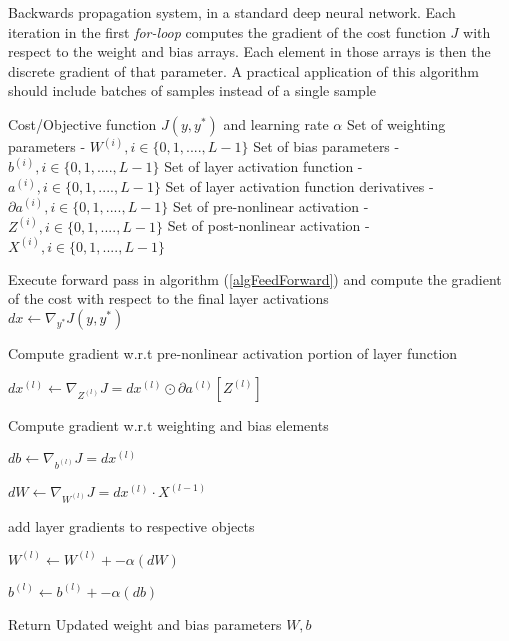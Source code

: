 \documentclass[12pt,letterpaper]{article}
\begin{document}
\begin{algorithm}[H]
\caption{Backwards propagation system, in a standard deep neural network. Each iteration in the first \textit{for-loop} computes the gradient of the cost function $J$ with respect to the weight and bias arrays. Each element in those arrays is then the discrete gradient of that parameter. A practical application of this algorithm should include batches of samples instead of a single sample}
\label{algBackProp}

\begin{algorithmic}
\REQUIRE Cost/Objective function $J(y,y^*)$ and learning rate $\alpha$
\REQUIRE Set of weighting parameters - $W^{(i)}, i \in \{0,1,....,L-1\}$
\REQUIRE Set of bias parameters - $b^{(i)}, i \in \{0,1,....,L-1\}$
\REQUIRE Set of layer activation function - $a^{(i)}, i \in \{0,1,....,L-1\}$
\REQUIRE Set of layer activation function derivatives - $\partial a^{(i)}, i \in \{0,1,....,L-1\}$
\REQUIRE Set of pre-nonlinear activation - $Z^{(i)}, i \in \{0,1,....,L-1\}$
\REQUIRE Set of post-nonlinear activation - $X^{(i)}, i \in \{0,1,....,L-1\}$

Execute forward pass in algorithm (\ref{algFeedForward}) and compute the gradient of the cost with respect to the final layer activations \\
$dx \leftarrow \nabla_{y^*}J(y,y^*)$ \\

	\item Compute gradient w.r.t pre-nonlinear activation portion of layer function
	\item $dx^{(l)} \leftarrow \nabla_{Z^{(l)}}J = dx^{(l)} \odot \partial a^{(l)}[ Z^{(l)} ]$
	\item Compute gradient w.r.t weighting and bias elements
	\item $db \leftarrow \nabla_{b^{(l)}}J = dx^{(l)}$
	\item $dW \leftarrow \nabla_{W^{(l)}}J = dx^{(l)} \cdot X^{(l-1)}$
	\item add layer gradients to respective objects
	\item $W^{(l)} \leftarrow W^{(l)} + -\alpha(dW)$
	\item $b^{(l)} \leftarrow b^{(l)} + -\alpha(db)$
\ENDFOR

\item Return Updated weight and bias parameters
\RETURN $W , b$

\end{algorithmic}
\end{algorithm}
\end{document}
